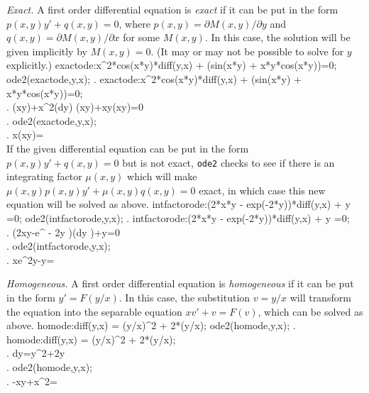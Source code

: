 \documentclass{article}
\begin{document}
\noindent
\textit{Exact.}\quad
A first order differential equation is 
\textit{exact} if it can be put in the form $p(x,y)y'+q(x,y)=0$, where
$p(x,y) = \partial M(x,y) /\partial y$ and 
$q(x,y) = \partial M(x,y) /\partial x$ for some $M(x,y)$.  In this
case, the solution will be given implicitly by $M(x,y)=0$.
(It may or may not be possible to solve for $y$ explicitly.)
\beginmaximasession
exactode:x^2*cos(x*y)*diff(y,x) + (sin(x*y) + x*y*cos(x*y))=0;
ode2(exactode,y,x);
\maximatexsession
{}.  exactode:x^2*cos(x*y)*diff(y,x) + (sin(x*y) + x*y*cos(x*y))=0; \\
.   \sin \left(x\*y\right)+x^{2}\*\left({{d}}\*y\right)
 \*\cos \left(x\*y\right)+x\*y\*\cos \left(x\*y\right)=0 \\
.  ode2(exactode,y,x); \\
.   x\*\sin \left(x\*y\right)= \\
\endmaximasession
\noindent
If the given differential equation can be put in the form 
$p(x,y)y' + q(x,y)=0$ but is not exact, \texttt{ode2} checks to see if
there is an integrating factor $\mu(x,y)$ which will make
$\mu(x,y)p(x,y)y' + \mu(x,y)q(x,y)=0$ exact, in which case this new
equation will be solved as above.
\beginmaximasession
intfactorode:(2*x*y - exp(-2*y))*diff(y,x) + y =0;
ode2(intfactorode,y,x);
\maximatexsession
{}.  intfactorode:(2*x*y - exp(-2*y))*diff(y,x) + y =0; \\
.   \left(2\*x\*y-e^ {- 2\*y }\right)\*\left({{d}}\*y
 \right)+y=0 \\
.  ode2(intfactorode,y,x); \\
.   x\*e^{2\*y}-\log y= \\
\endmaximasession

\smallskip

\noindent
\textit{Homogeneous.}\quad
A first order differential equation is \textit{homogeneous} if it can
be put in the form $y'=F(y/x)$.  In this case, the substitution
$v=y/x$ will transform the equation into the separable equation
$xv'+v=F(v)$, which can be solved as above.
\beginmaximasession
homode:diff(y,x) = (y/x)^2 + 2*(y/x);
ode2(homode,y,x);
\maximatexsession
{}.  homode:diff(y,x) = (y/x)^2 + 2*(y/x); \\
.   {{d}}\*y={{y^{2}}}+{{2\*y}} \\
.  ode2(homode,y,x); \\
.   -{{x\*y+x^{2}}}= \\
\endmaximasession
\end{document}
